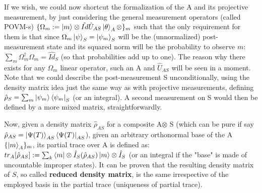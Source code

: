 \documentclass[11pt, a4paper]{article} %
\begin{document}
If we wish, we could now shortcut the formalization of the A and its projective measurement, by just considering the general measurement operators (called POVM-s) $\{\Omega_m:=\ket{m}\otimes\hat{Id}\hat{U}_{AS}\ket{\theta}_A\otimes\}_m$ such that the only requirement for them is that since $\Omega_m\ket{\psi}_S=\ket{\psi_m}_S$ will be the (unnormalized) post-measurement state and its squared norm will be the probability to observe $m$: $\sum_m \Omega_m^\dagger\Omega_m=\hat{Id}_S$ (so that probabilities add up to one). The reason why there exists for any $\Omega_m$ linear operator, such an A and $\hat{U}_{AS}$ will be seen in a moment. Note that we could describe the post-measurement S unconditionally, using the density matrix idea just the same way as with projective measurements, defining $\hat{\rho}_S=\sum_m \ket{\psi_m}\bra{\psi_m}_S$ (or an integral). A second measurement on S would then be defined by a more mixed matrix, straightforwardly.

Now, given a density matrix $\hat{\rho}_{AS}$ for a composite A$\otimes$ S (which can be pure if say $\hat{\rho}_{AS}=\ket{\Psi(T)}_{AS}\bra{\Psi(T)}_{AS}$), given an arbitrary orthonormal base of the A $\{\ket{m}_A\}_m$, its partial trace over A is defined as: $tr_{A}[\hat{\rho}_{AS}] := \sum_k \bra{m}\otimes \hat{I}_S(\hat{\rho}_{AS})\ket{m}\otimes \hat{I}_S$ (or an integral if the "base" is made of uncountable improper states). It can be proven that the resulting density matrix of $S$, so called {\bf reduced density matrix}, is the same irrespective of the employed basis in the partial trace (uniqueness of partial trace). 
\end{document}

